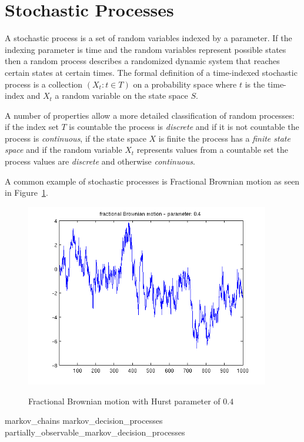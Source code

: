 \section{Stochastic Processes}

A stochastic process is a set of random variables indexed by a parameter. If the indexing parameter is time and the random variables represent possible states then a random process describes a randomized dynamic system that reaches certain states at certain times. The formal definition of a time-indexed stochastic process is a collection $(X_t: t \in T)$ on a probability space where $t$ is the time-index and $X_t$ a random variable on the state space $S$.

A number of properties allow a more detailed classification of random processes: if the index set $T$ is countable the process is \textit{discrete} and if it is not countable the process is \textit{continuous}, if the state space $X$ is finite the process has a \textit{finite state space} and if the random variable $X_t$ represents values from a countable set the process values are \textit{discrete} and otherwise \textit{continuous}.

A common example of stochastic processes is Fractional Brownian motion as seen in Figure~\ref{fracbromotion}.

\begin{figure}
\begin{center}
\includegraphics[height=8cm]{media/fractional_brownian_motion}\\
\end{center}
\caption{Fractional Brownian motion with Hurst parameter of $0.4$}
\label{fracbromotion}
\end{figure}

{markov_chains}
{markov_decision_processes}
{partially_observable_markov_decision_processes}